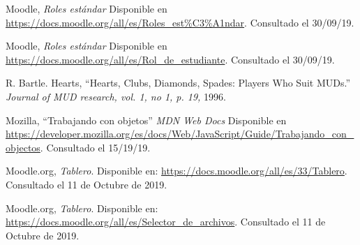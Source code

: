 \begin{thebibliography}{9}
        Moodle, {\it Roles estándar}
        Disponible en \url{https://docs.moodle.org/all/es/Roles_est\%C3\%A1ndar}.
        Consultado el 30/09/19.

        Moodle, {\it Roles estándar}
        Disponible en \url{https://docs.moodle.org/all/es/Rol_de_estudiante}.
        Consultado el 30/09/19.

        R. Bartle. Hearts, 
        ``Hearts, Clubs, Diamonds, Spades: Players Who Suit MUDs.''
        \textit{Journal of MUD research, vol. 1, no 1, p. 19,} 1996.


        Mozilla, 
        ``Trabajando con objetos''
        \textit{MDN Web Docs} Disponible en
        \url{https://developer.mozilla.org/es/docs/Web/JavaScript/Guide/Trabajando_con_objectos}.
        Consultado el 15/19/19.

        Moodle.org, {\it Tablero}.
        Disponible en: \url{https://docs.moodle.org/all/es/33/Tablero}.
        Consultado el 11 de Octubre de 2019.
    
        Moodle.org, {\it Tablero}.
        Disponible en: \url{https://docs.moodle.org/all/es/Selector_de_archivos}.
        Consultado el 11 de Octubre de 2019.








    

\end{thebibliography}
